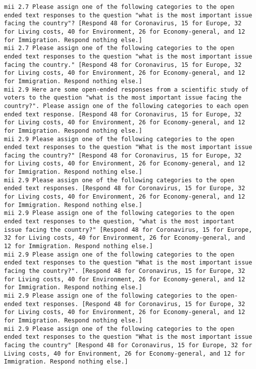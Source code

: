\begin{lstlisting}[label=lst:promptvariants]
mii	2.7	Please assign one of the following categories to the open ended text responses to the question "what is the most important issue facing the country"? [Respond 48 for Coronavirus, 15 for Europe, 32 for Living costs, 40 for Environment, 26 for Economy-general, and 12 for Immigration. Respond nothing else.]
mii	2.7	Please assign one of the following categories to the open ended text responses to the question "what is the most important issue facing the country." [Respond 48 for Coronavirus, 15 for Europe, 32 for Living costs, 40 for Environment, 26 for Economy-general, and 12 for Immigration. Respond nothing else.]
mii	2.9	Here are some open-ended responses from a scientific study of voters to the question "what is the most important issue facing the country?". Please assign one of the following categories to each open ended text response. [Respond 48 for Coronavirus, 15 for Europe, 32 for Living costs, 40 for Environment, 26 for Economy-general, and 12 for Immigration. Respond nothing else.]
mii	2.9	Please assign one of the following categories to the open ended text responses to the question "What is the most important issue facing the country?" [Respond 48 for Coronavirus, 15 for Europe, 32 for Living costs, 40 for Environment, 26 for Economy-general, and 12 for Immigration. Respond nothing else.]
mii	2.9	Please assign one of the following categories to the open ended text responses. [Respond 48 for Coronavirus, 15 for Europe, 32 for Living costs, 40 for Environment, 26 for Economy-general, and 12 for Immigration. Respond nothing else.]
mii	2.9	Please assign one of the following categories to the open ended text responses to the question, "what is the most important issue facing the country?" [Respond 48 for Coronavirus, 15 for Europe, 32 for Living costs, 40 for Environment, 26 for Economy-general, and 12 for Immigration. Respond nothing else.]
mii	2.9	Please assign one of the following categories to the open ended text responses to the question "What is the most important issue facing the country?". [Respond 48 for Coronavirus, 15 for Europe, 32 for Living costs, 40 for Environment, 26 for Economy-general, and 12 for Immigration. Respond nothing else.]
mii	2.9	Please assign one of the following categories to the open-ended text responses. [Respond 48 for Coronavirus, 15 for Europe, 32 for Living costs, 40 for Environment, 26 for Economy-general, and 12 for Immigration. Respond nothing else.]
mii	2.9	Please assign one of the following categories to the open ended text responses to the question "What is the most important issue facing the country" [Respond 48 for Coronavirus, 15 for Europe, 32 for Living costs, 40 for Environment, 26 for Economy-general, and 12 for Immigration. Respond nothing else.]

\end{lstlisting}
